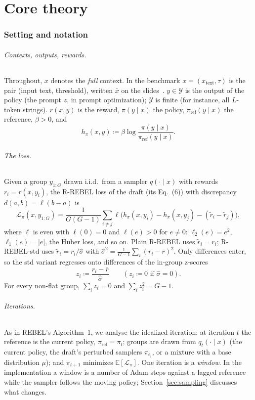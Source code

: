 \documentclass[11pt]{article}
\theoremstyle{definition}
\theoremstyle{remark}
\newcommand{\E}{\mathbb{E}}
\newcommand{\pref}{\pi_{\mathrm{ref}}}
\newcommand{\cY}{\mathcal{Y}}
\newcommand{\cL}{\mathcal{L}}
\newcommand{\1}{\mathbb{1}}
\newcommand{\rr}{R-REBEL}
\newcommand{\rrs}{R-REBEL-std}
\begin{document}
\part{Core theory}

\section{Setting and notation}\label{sec:setting}

\paragraph{Contexts, outputs, rewards.} Throughout, $x$ denotes the \emph{full}
context. In the benchmark $x=(x_{\mathrm{text}},\tau)$ is the pair (input text,
threshold), written $\bar x$ on the slides~\cite{slides}. $y\in\cY$ is the output of
the policy (the prompt $z$, in prompt optimization); $\cY$ is finite (for instance,
all $L$-token strings). $r(x,y)$ is the reward, $\pi(y\mid x)$ the policy,
$\pref(y\mid x)$ the reference, $\beta>0$, and
\[
  h_\pi(x,y) \coloneqq \beta\log\frac{\pi(y\mid x)}{\pref(y\mid x)} .
\]

\paragraph{The loss.} Given a group $y_{1:G}$ drawn i.i.d.\ from a sampler
$q(\cdot\mid x)$ with rewards $r_i=r(x,y_i)$, the \rr{} loss of the draft (its
Eq.~(6)) with discrepancy $d(a,b)=\ell(b-a)$ is
\begin{equation}\label{eq:loss}
  \cL_\pi(x,y_{1:G}) = \frac{1}{G(G-1)}\sum_{i\neq j}
  \ell\bigl(h_\pi(x,y_i)-h_\pi(x,y_j)-(\tilde r_i-\tilde r_j)\bigr),
\end{equation}
where $\ell$ is even with $\ell(0)=0$ and $\ell(e)>0$ for $e\neq0$: $\ell_2(e)=e^2$,
$\ell_1(e)=|e|$, the Huber loss, and so on. Plain \rr{} uses $\tilde r_i=r_i$; \rrs{}
uses $\tilde r_i=r_i/\hat\sigma$ with $\hat\sigma^2=\frac{1}{G-1}\sum_i(r_i-\bar r)^2$.
Only differences enter, so the std variant regresses onto differences of the
in-group z-scores
\begin{equation}\label{eq:z}
  z_i \coloneqq \frac{r_i-\bar r}{\hat\sigma}\qquad(z_i\coloneqq 0\text{ if }\hat\sigma=0).
\end{equation}
For every non-flat group, $\sum_i z_i=0$ and $\sum_i z_i^2=G-1$.

\paragraph{Iterations.} As in REBEL's Algorithm~1, we analyse the idealized
iteration: at iteration $t$ the reference is the current policy, $\pref=\pi_t$;
groups are drawn from $q_t(\cdot\mid x)$ (the current policy, the draft's perturbed
samplers $\pi_{\epsilon_i}$, or a mixture with a base distribution $\mu$); and
$\pi_{t+1}$ minimizes $\E[\cL_\pi]$. One iteration is a \emph{window}. In the
implementation a window is a number of Adam steps against a lagged reference while
the sampler follows the moving policy; Section~\ref{sec:sampling} discusses what
changes.
\end{document}
